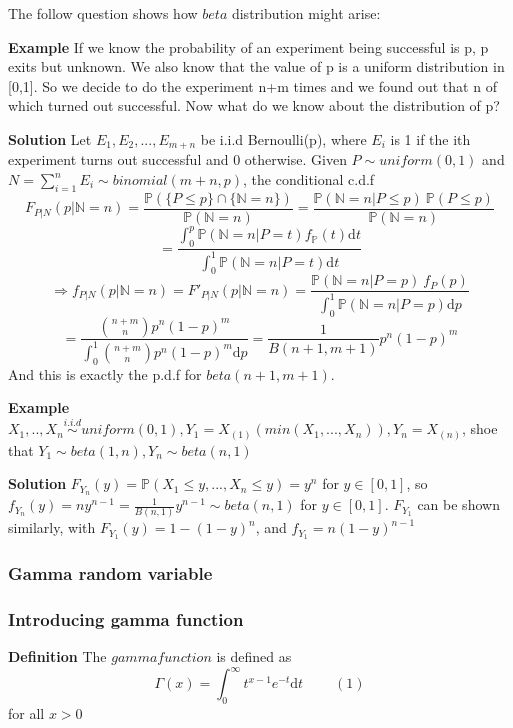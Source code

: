 \documentclass[a4paper,12pt]{article}
\begin{document}
The follow question shows how $beta$ distribution might arise: 

\textbf{Example} If we know the probability of an experiment being successful is p, p exits but unknown. We also know that the value of p is a uniform distribution in [0,1]. So we decide to do the experiment n+m times and we found out that n of which turned out successful. Now what do we know about the distribution of p? 

\textbf{Solution}
Let $E_1, E_2, ..., E_{m+n}$ be i.i.d Bernoulli(p), where $E_i$ is 1 if the ith experiment turns out successful and 0 otherwise. Given $P \sim uniform(0, 1)$ and $N = \sum_{i=1}^n E_i \sim binomial(m+n, p)$, the conditional c.d.f 
$$F_{P|N}(p|\mathbb{N}=n) = \frac{\mathbb{P}( \{P \leq p\} \cap \{\mathbb{N} = n\} )}{\mathbb{P}(\mathbb{N} = n)} = \frac{\mathbb{P}( \mathbb{N} = n | P \leq p )\  \mathbb{P}( P \leq p )}{\mathbb{P}(\mathbb{N} = n)} $$
$$= \frac{\int_0^p \mathbb{P} (\mathbb{N} = n | P=t) f_\mathbb{P}(t)\mathrm{d}t }{\int_0^1 \mathbb{P} (\mathbb{N} = n | P=t) \mathrm{d}t }$$
$$\Rightarrow f_{P|N}(p|\mathbb{N}=n) = F'_{P|N}(p|\mathbb{N}=n) =   \frac{\mathbb{P} (\mathbb{N} = n | P=p)\ f_P(p)}{\int_0^1 \mathbb{P} (\mathbb{N} = n | P=p) \mathrm{d}p }$$
$$= \frac{ {n+m \choose n}p^n(1-p)^m }{\int_0^1{ n+m \choose n}p^n(1-p)^m\mathrm{d}p} = \frac{1}{B(n+1, m+1)} p^n (1-p)^m$$
And this is exactly the p.d.f for $beta(n+1, m+1)$. 

\textbf{Example} $X_1, .., X_n \overset{i.i.d}{\sim} uniform(0, 1), Y_1 = X_{(1)} (min( X_1, ..., X_n )), Y_n = X_{(n)}$, shoe that $Y_1 \sim beta(1, n), Y_n \sim beta(n, 1)$ 

\textbf{Solution}
$F_{Y_n}(y) = \mathbb{P}(X_1 \leq y, ..., X_n \leq y) = y^n $ for $y \in [0, 1]$, so $f_{Y_n}(y) = ny^{n-1} = \frac{1}{B(n, 1)}y^{n-1} \sim beta(n, 1)$ for $y \in [0, 1]$. $F_{Y_1}$ can be shown similarly, with $F_{Y_1}(y) = 1-(1-y)^n$, and $f_{Y_1} = n(1-y)^{n-1}$

\subsubsection{Gamma random variable}
\subsubsection*{Introducing gamma function}
\textbf{Definition} The $gamma function$ is defined as
{\center}$$\Gamma(x) = \int_0^{\infty} t^{x-1}e^{-t} \mathrm{d}t\ \ \ \ \ \ \ \ \ \ (1)$${\center} 
for all $x > 0$  
\end{document}

